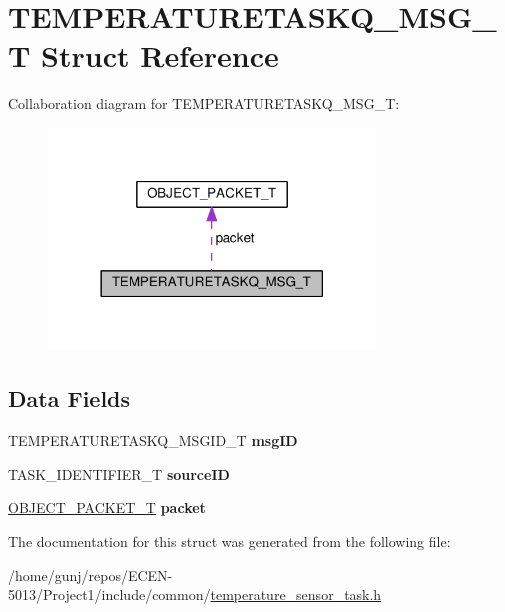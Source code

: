 \hypertarget{structTEMPERATURETASKQ__MSG__T}{}\section{T\+E\+M\+P\+E\+R\+A\+T\+U\+R\+E\+T\+A\+S\+K\+Q\+\_\+\+M\+S\+G\+\_\+T Struct Reference}
\label{structTEMPERATURETASKQ__MSG__T}


Collaboration diagram for T\+E\+M\+P\+E\+R\+A\+T\+U\+R\+E\+T\+A\+S\+K\+Q\+\_\+\+M\+S\+G\+\_\+T\+:\nopagebreak
\begin{figure}[H]
\begin{center}
\leavevmode
\includegraphics[width=246pt]{structTEMPERATURETASKQ__MSG__T__coll__graph}
\end{center}
\end{figure}
\subsection*{Data Fields}
\begin{DoxyCompactItemize}
\item 
T\+E\+M\+P\+E\+R\+A\+T\+U\+R\+E\+T\+A\+S\+K\+Q\+\_\+\+M\+S\+G\+I\+D\+\_\+T {\bfseries msg\+ID}\hypertarget{structTEMPERATURETASKQ__MSG__T_a3193f82c175e24995eae8c2819c410e3}{}\label{structTEMPERATURETASKQ__MSG__T_a3193f82c175e24995eae8c2819c410e3}

\item 
T\+A\+S\+K\+\_\+\+I\+D\+E\+N\+T\+I\+F\+I\+E\+R\+\_\+T {\bfseries source\+ID}\hypertarget{structTEMPERATURETASKQ__MSG__T_ae8775f7bc7322da94b6827c42f28ffd1}{}\label{structTEMPERATURETASKQ__MSG__T_ae8775f7bc7322da94b6827c42f28ffd1}

\item 
\hyperlink{structOBJECT__PACKET__T}{O\+B\+J\+E\+C\+T\+\_\+\+P\+A\+C\+K\+E\+T\+\_\+T} {\bfseries packet}\hypertarget{structTEMPERATURETASKQ__MSG__T_ad8ac382a5319e5252b1af86b45333fb8}{}\label{structTEMPERATURETASKQ__MSG__T_ad8ac382a5319e5252b1af86b45333fb8}

\end{DoxyCompactItemize}


The documentation for this struct was generated from the following file\+:\begin{DoxyCompactItemize}
\item 
/home/gunj/repos/\+E\+C\+E\+N-\/5013/\+Project1/include/common/\hyperlink{temperature__sensor__task_8h}{temperature\+\_\+sensor\+\_\+task.\+h}\end{DoxyCompactItemize}
